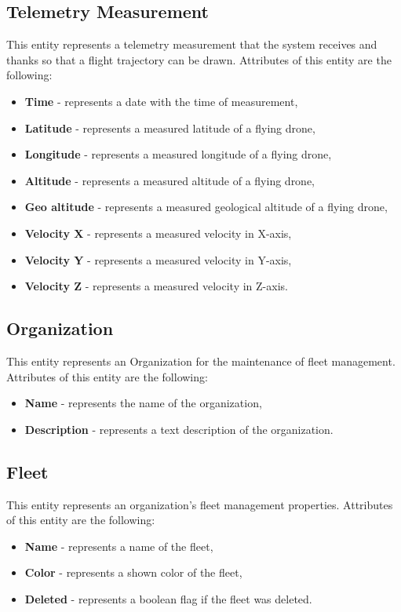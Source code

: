 \subsection{Telemetry Measurement}\label{subsec:telemetry-measurement}
This entity represents a telemetry measurement that the system receives and thanks so that a flight trajectory can be drawn.
Attributes of this entity are the following:
\begin{itemize}
    \item \textbf{Time} - represents a date with the time of measurement,
    \item \textbf{Latitude} - represents a measured latitude of a flying drone,
    \item \textbf{Longitude} - represents a measured longitude of a flying drone,
    \item \textbf{Altitude} - represents a measured altitude of a flying drone,
    \item \textbf{Geo altitude} - represents a measured geological altitude of a flying drone,
    \item \textbf{Velocity X} - represents a measured velocity in X-axis,
    \item \textbf{Velocity Y} - represents a measured velocity in Y-axis,
    \item \textbf{Velocity Z} - represents a measured velocity in Z-axis.
\end{itemize}

\subsection{Organization}\label{subsec:organization}
This entity represents an Organization for the maintenance of fleet management.
Attributes of this entity are the following:
\begin{itemize}
    \item \textbf{Name} - represents the name of the organization,
    \item \textbf{Description} - represents a text description of the organization.
\end{itemize}

\subsection{Fleet}\label{subsec:fleet}
This entity represents an organization's fleet management properties.
Attributes of this entity are the following:
\begin{itemize}
    \item \textbf{Name} - represents a name of the fleet,
    \item \textbf{Color} - represents a shown color of the fleet,
    \item \textbf{Deleted} - represents a boolean flag if the fleet was deleted.
\end{itemize}

